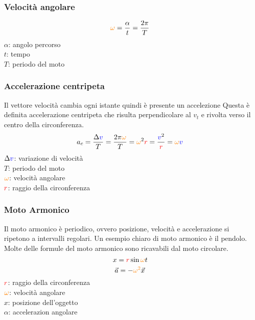 \subsubsection{Velocità angolare}
\begin{equation*}
  \mathcolor{orange}{\omega} = \frac{\alpha}{t} = \frac{2\pi}{T}
\end{equation*}
$\alpha$: angolo percorso\\ 
$t$: tempo\\
$T$: periodo del moto

\subsubsection{Accelerazione centripeta}
Il vettore velocità cambia ogni istante quindi è presente un accelezione Questa è definita 
accelerazione centripeta che risulta perpendicolare al $v_t$ e rivolta verso il centro della 
circonferenza.
\begin{equation*}
  a_c = \frac{\Delta \mathcolor{blue}{v}}{T} = \frac{2\pi\mathcolor{orange}{\omega}}{T} = 
  \mathcolor{orange}{\omega}^2\mathcolor{red}{r} = \frac{\mathcolor{blue}{v}^2}{\mathcolor{red}{r}} = 
  \mathcolor{orange}{\omega}\mathcolor{blue}{v}
\end{equation*}
$\Delta\mathcolor{blue}{v}$: variazione di velocità\\
$T$: periodo del moto\\
$\mathcolor{orange}{\omega}$: velocità angolare\\
$\mathcolor{red}{r}$: raggio della circonferenza

\subsubsection{Moto Armonico}
Il moto armonico è periodico, ovvero posizione, velocità e accelerazione si ripetono a intervalli 
regolari. Un esempio chiaro di moto armonico è il pendolo.\\
Molte delle formule del moto armonico sono ricavabili dal moto circolare.
\begin{equation*}
  x = \mathcolor{red}{r}\sin\mathcolor{orange}{\omega}t
\end{equation*}
\begin{equation*}
  \vec{a} = -\mathcolor{orange}{\omega^2}\vec{x}
\end{equation*}
$\mathcolor{red}{r}$: raggio della circonferenza\\
$\mathcolor{orange}{\omega}$: velocità angolare\\
$x$: posizione dell'oggetto\\
$\alpha$: accelerazion angolare

